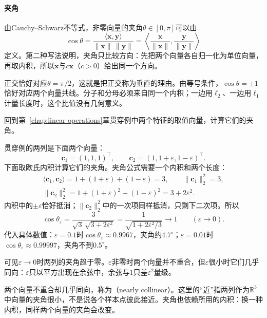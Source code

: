 \paragraph{夹角}
由Cauchy--Schwarz不等式，非零向量的夹角$\theta\in[0,\pi]$可以由
\begin{equation}
 \cos\theta=\frac{\langle\bm x,\bm y\rangle}{\lVert\bm x\rVert\,\lVert\bm y\rVert}
 =\left\langle\frac{\bm x}{\lVert\bm x\rVert},\frac{\bm y}{\lVert\bm y\rVert}\right\rangle
 \label{eq:ls-inner-product-angle}
\end{equation}
定义。第二种写法说明，夹角只比较方向：先把两个向量各自归一化为单位向量，再取内积，所以$\bm x$与$c\bm x$（$c>0$）给出同一个方向。

正交恰好对应$\theta=\pi/2$，这就是把正交称为垂直的理由。由等号条件，$\cos\theta=\pm1$恰好对应两个向量共线。分子和分母必须来自同一个内积；一边用$\ell_2$、一边用$\ell_1$计量长度时，这个比值没有几何意义。

回到第~\ref{chap:linear-operations}章贯穿例中两个特征的取值向量，计算它们的夹角。
\begin{example}[贯穿例两列的夹角]
\label{ex:ls-nearly-collinear-angle}
贯穿例的两列是下面两个向量：
\[
 \bm c_1=(1,1,1)^\top,\qquad\bm c_2=(1,1+\varepsilon,1-\varepsilon)^\top.
\]
下面取欧氏内积计算它们的夹角。夹角公式需要一个内积和两个长度：
\[
 \begin{gathered}
 \langle\bm c_1,\bm c_2\rangle=1+(1+\varepsilon)+(1-\varepsilon)=3,\qquad\lVert\bm c_1\rVert_2^2=3,\\
 \lVert\bm c_2\rVert_2^2=1+(1+\varepsilon)^2+(1-\varepsilon)^2=3+2\varepsilon^2 .
 \end{gathered}
\]
内积中的$\pm\varepsilon$恰好抵消；$\lVert\bm c_2\rVert_2^2$中的一次项同样抵消，只剩下二次项。所以
\begin{equation}
 \cos\theta_\varepsilon=\frac{3}{\sqrt3\,\sqrt{3+2\varepsilon^2}}
 =\frac{1}{\sqrt{1+2\varepsilon^2/3}}\longrightarrow1\qquad(\varepsilon\to0).
 \label{eq:linear-algebra-nearly-collinear-angle}
\end{equation}
代入具体数值：$\varepsilon=0.1$时$\cos\theta_\varepsilon\approx0.9967$，夹角约$4.7^\circ$；$\varepsilon=0.01$时$\cos\theta_\varepsilon\approx0.99997$，夹角不到$0.5^\circ$。

可见$\varepsilon\to0$时两列的夹角趋于零。$\varepsilon$非零时两个向量并不重合，但$\varepsilon$很小时它们几乎同向：$\varepsilon$只以平方出现在余弦中，余弦与$1$只差$\varepsilon^2$量级。
\end{example}
两个向量不重合却几乎同向，称为（nearly collinear）。这里的“近”指两列作为$\mathbb R^3$中向量的夹角很小，不是说各个样本点彼此接近。夹角也依赖所用的内积：换一种内积，同样两个向量的夹角会改变。
